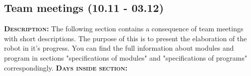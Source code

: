 \subsection{Team meetings (10.11 - 03.12)}
	\textsc{\textbf{Description:}} The following section contains a consequence of team meetings with short descriptions. The purpose of this is to present the elaboration of the robot in it's progress. You can find the full information about modules and program in sections "specifications of modules" and "specifications of programs" correspondingly. \newline
	\textsc{\textbf{Days inside section:}}
	
	
	
	
	
	
	
	
	
	
	
	
